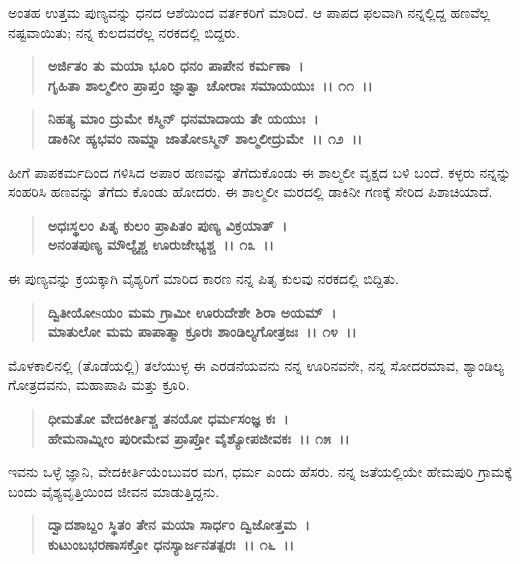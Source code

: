 ಅಂತಹ ಉತ್ತಮ ಪುಣ್ಯವನ್ನು ಧನದ ಆಶೆಯಿಂದ ವರ್ತಕರಿಗೆ ಮಾರಿದೆ. ಆ ಪಾಪದ ಫಲವಾಗಿ ನನ್ನಲ್ಲಿದ್ದ ಹಣವೆಲ್ಲ ನಷ್ಟವಾಯಿತು; ನನ್ನ ಕುಲದವರೆಲ್ಲ ನರಕದಲ್ಲಿ ಬಿದ್ದರು.

\begin{verse}
\textbf{ಅರ್ಜಿತಂ ತು ಮಯಾ ಭೂರಿ ಧನಂ ಪಾಪೇನ ಕರ್ಮಣಾ~।}\\\textbf{ಗೃಹಿತಾ ಶಾಲ್ಮಲೀಂ ಪ್ರಾಪ್ತಂ ಜ್ಞಾತ್ವಾ ಚೋರಾಃ ಸಮಾಯಯುಃ~।। ೧೧~।।}
\end{verse}

\begin{verse}
\textbf{ನಿಹತ್ಯ ಮಾಂ ದ್ರುಮೇ ಕಸ್ಮಿನ್ ಧನಮಾದಾಯ ತೇ ಯಯುಃ~।}\\\textbf{ಡಾಕಿನೀ ಹ್ಯಭವಂ ನಾಮ್ನಾ ಜಾತೋಽಸ್ಮಿನ್ ಶಾಲ್ಮಲೀದ್ರುಮೇ~।। ೧೨~।।}
\end{verse}

ಹೀಗೆ ಪಾಪಕರ್ಮದಿಂದ ಗಳಿಸಿದ ಅಪಾರ ಹಣವನ್ನು ತೆಗೆದುಕೊಂಡು ಈ ಶಾಲ್ಮಲೀ ವೃಕ್ಷದ ಬಳಿ ಬಂದೆ. ಕಳ್ಳರು ನನ್ನನ್ನು ಸಂಹರಿಸಿ ಹಣವನ್ನು ತೆಗೆದು ಕೊಂಡು ಹೋದರು. ಈ ಶಾಲ್ಮಲೀ ಮರದಲ್ಲಿ ಡಾಕಿನೀ ಗಣಕ್ಕೆ ಸೇರಿದ ಪಿಶಾಚಿಯಾದೆ.

\begin{verse}
\textbf{ಅಧಃಸ್ಥಲಂ ಪಿತೃ ಕುಲಂ ಪ್ರಾಪಿತಂ ಪುಣ್ಯ ವಿಕ್ರಯಾತ್~।}\\\textbf{ಅನಂತಪುಣ್ಯ ಮೌಲ್ಯೈಶ್ಚ ಊರುಜೇಭ್ಯಶ್ಚ~।। ೧೩~।।}
\end{verse}

ಈ ಪುಣ್ಯವನ್ನು ಕ್ರಯಕ್ಕಾಗಿ ವೈಶ್ಯರಿಗೆ ಮಾರಿದ ಕಾರಣ ನನ್ನ ಪಿತೃ ಕುಲವು ನರಕದಲ್ಲಿ ಬಿದ್ದಿತು.

\begin{verse}
\textbf{ದ್ವಿತೀಯೋsಯಂ ಮಮ ಗ್ರಾಮೀ ಊರುದೇಶೇ ಶಿರಾ ಅಯಮ್~।}\\\textbf{ಮಾತುಲೋ ಮಮ ಪಾಪಾತ್ಮಾ ಕ್ರೂರಃ ಶಾಂಡಿಲ್ಯಗೋತ್ರಜಃ~।। ೧೪~।।}
\end{verse}

ಮೊಳಕಾಲಿನಲ್ಲಿ (ತೊಡೆಯಲ್ಲಿ) ತಲೆಯುಳ್ಳ ಈ ಎರಡನೆಯವನು ನನ್ನ ಊರಿನವನೇ, ನನ್ನ ಸೋದರಮಾವ, ಶ್ಯಾಂಡಿಲ್ಯ ಗೋತ್ರದವನು, ಮಹಾಪಾಪಿ ಮತ್ತು ಕ್ರೂರಿ.

\begin{verse}
\textbf{ಧೀಮತೋ ವೇದಕೀರ್ತಿಶ್ಚ ತನಯೋ ಧರ್ಮಸಂಜ್ಞ ಕಃ~।}\\\textbf{ಹೇಮನಾಮ್ನೀಂ ಪುರೀಮೇವ ಪ್ರಾಪ್ತೋ ವೈಶ್ಯೋಪಜೀವಕಃ~।। ೧೫~।।}
\end{verse}

ಇವನು ಒಳ್ಳೆ ಜ್ಞಾನಿ, ವೇದಕೀರ್ತಿಯೆಂಬುವರ ಮಗ, ಧರ್ಮ ಎಂದು ಹೆಸರು. ನನ್ನ ಜತೆಯಲ್ಲಿಯೇ ಹೇಮಪುರಿ ಗ್ರಾಮಕ್ಕೆ ಬಂದು ವೈಶ್ಯವೃತ್ತಿಯಿಂದ ಜೀವನ ಮಾಡುತ್ತಿದ್ದನು.

\begin{verse}
\textbf{ದ್ವಾದಶಾಬ್ದಂ ಸ್ಥಿತಂ ತೇನ ಮಯಾ ಸಾರ್ಧಂ ದ್ವಿಜೋತ್ತಮ~।}\\\textbf{ಕುಟುಂಬಭರಣಾಸಕ್ತೋ ಧನಸ್ಯಾರ್ಜನತತ್ಪರಃ~।। ೧೬~।।}
\end{verse}

